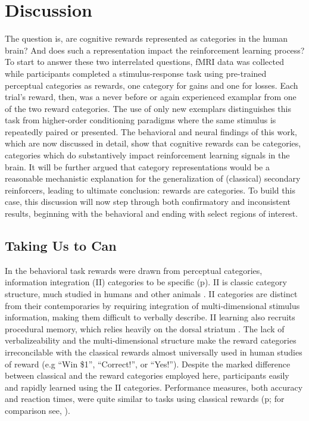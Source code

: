 \section{Discussion}
\label{sec:dicussion}
The question is, are cognitive rewards represented as categories in the human brain?  And does such a representation impact the reinforcement learning process?  To start to answer these two interrelated questions, fMRI data was collected while participants completed a stimulus-response task using pre-trained perceptual categories as rewards, one category for gains and one for losses.  Each trial's reward, then, was a never before or again experienced examplar from one of the two reward categories.  The use of only new exemplars distinguishes this task from higher-order conditioning paradigms where the same stimulus is repeatedly paired or presented.  The behavioral and neural findings of this work, which are now discussed in detail, show that cognitive rewards can be categories, categories which do substantively impact reinforcement learning signals in the brain.  It will be further argued that category representations would be a reasonable mechanistic explanation for the generalization of (classical) secondary reinforcers, leading to ultimate conclusion: rewards are categories.  To build this case, this discussion will now step through both confirmatory and inconsistent results, beginning with the behavioral and ending with select regions of interest.

\subsection{Taking Us to Can}
\label{sub:tocan}
In the behavioral task rewards were drawn from perceptual categories, information integration (II) categories to be specific (p\pageref{subsub:whatwhen}).  II is classic category structure, much studied in humans and other animals \cite{Smith:2011p9101,Ashby:2011p9148,Smith:2010p9713}.  II categories are distinct from their contemporaries by requiring integration of multi-dimensional stimulus information, making them difficult to verbally describe. II learning also recruits procedural memory, which relies heavily on the dorsal striatum \cite{Ashby:1998p9716}.   The lack of verbalizeability and the multi-dimensional structure make the reward categories irreconcilable with the classical rewards almost universally used in human studies of reward (e.g ``Win \$1'', ``Correct!'', or ``Yes!'').  Despite the marked difference between classical and the reward categories employed here, participants easily and rapidly learned using the II categories.  Performance measures, both accuracy and reaction times, were quite similar to tasks using classical rewards (p\pageref{subsub:wellbehaved}; for comparison see, ).

